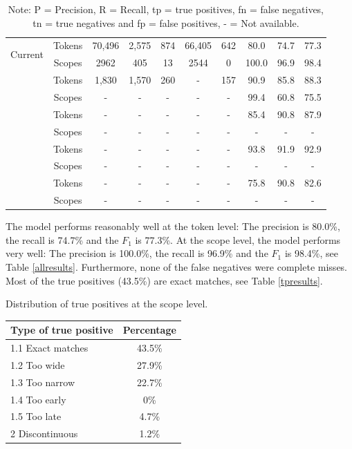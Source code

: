 \documentclass{article}
\begin{document}
\begin{multicols}{2}
\begin{table}[t]
\begin{tabular}{l c | c c c c c | c c c}
	\multirow{2}{*}{Current} & Tokens & 70,496 & 2,575 & 874 & 66,405 & 642 & 80.0 & 74.7 &  77.3 \\
	 & Scopes & 2962 & 405 & 13 & 2544 & 0 & 100.0 & 96.9 & 98.4 \\
	\hline
	
	\multirow{2}{*}{\cite{fancellu2016neural}} & Tokens & 1,830 & 1,570 & 260 & - & 157 & 90.9 & 85.8 &  88.3 \\
	 & Scopes & - & - & - & - & - & 99.4 & 60.8 & 75.5 \\
	\hline
	
	\multirow{2}{*}{\cite{sergeeva2019}} & Tokens & - & - & - & - & - & 85.4 & 90.8 &  87.9 \\
	 & Scopes & - & - & - & - & - & - & - & - \\
	\hline
	
	\multirow{2}{*}{\cite{zou-etal-2013-tree}} & Tokens & - & - & - & - & - & 93.8 & 91.9 &  92.9 \\
	 & Scopes & - & - & - & - & - & - & - & - \\
	\hline
	
	\multirow{2}{*}{\cite{ozgur-radev-2009-detecting}} & Tokens & - & - & - & - & - & 75.8 & 90.8 &  82.6 \\
	 & Scopes & - & - & - & - & - & - & - & - \\
	\hline
	
	\end{tabular}
	\caption*{Note: P = Precision, R = Recall, tp = true positives, fn =  false negatives, tn = true negatives and fp = false positives, - = Not available.} 
\end{table}

The model performs reasonably well at the token level: The precision is 80.0\%, the recall is 74.7\% and the $F_1$ is 77.3\%. At the scope level, the model performs very well: The precision is 100.0\%, the recall is 96.9\% and the $F_1$ is 98.4\%, see Table \ref{allresults}. Furthermore, none of the false negatives were complete misses. Most of the true positives (43.5\%) are exact matches, see Table \ref{tpresults}.

\begin{center}
\captionsetup{type=table}
	\caption{Distribution of true positives at the scope level.}
	\label{tpresults}
	\begin{tabular}{l | c}
	\hline
	Type of true positive & Percentage  \\
	\hline \hline
	1.1 Exact matches & 43.5\% \\
	1.2 Too wide & 27.9\% \\
	1.3 Too narrow & 22.7\% \\
	1.4 Too early & 0\% \\
	1.5 Too late & 4.7\% \\
	2 Discontinuous & 1.2\% \\
	\hline
	\end{tabular}
\end{center}


\end{multicols}
\end{document}
